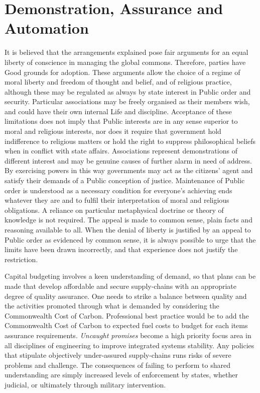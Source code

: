\documentclass[11pt, oneside]{book}   	%
\begin{document}
\section{Demonstration, Assurance and Automation}
It is believed that the arrangements explained pose fair arguments for an equal liberty of conscience in managing the global commons.
Therefore, parties have Good grounds for adoption.
These arguments allow the choice of a regime of moral liberty and freedom of thought and belief, and of religious practice, although these may be regulated as always by state interest in Public order and security.
Particular associations may be freely organised as their members wish, and could have their own internal Life and discipline.
Acceptance of these limitations does not imply that Public interests are in any sense superior to moral and religious interests, nor does it require that government hold indifference to religious matters or hold the right to suppress philosophical beliefs when in conflict with state affairs.
Associations represent demonstrations of different interest and may be genuine causes of further alarm in need of address.
By exercising powers in this way governments may act as the citizens' agent and satisfy their demands of a Public conception of justice.
Maintenance of Public order is understood as a necessary condition for everyone's achieving ends whatever they are and to fulfil their interpretation of moral and religious obligations.
A reliance on particular metaphysical doctrine or theory of knowledge is not required.
The appeal is made to common sense, plain facts and reasoning available to all.
When the denial of liberty is justified by an appeal to Public order as evidenced by common sense, it is always possible to urge that the limits have been drawn incorrectly, and that experience does not justify the restriction.\

Capital budgeting involves a keen understanding of demand, so that plans can be made that develop affordable and secure supply-chains with an appropriate degree of quality assurance.
One needs to strike a balance between quality and the activities promoted through what is demanded by considering the Commonwealth Cost of Carbon.
Professional best practice would be to add the Commonwealth Cost of Carbon to expected fuel costs to budget for each items assurance requirements.
\emph{Uncaught promises} become a high priority focus area in all disciplines of engineering to improve integrated systems stability.
Any policies that stipulate objectively under-assured supply-chains runs risks of severe problems and challenge.
The consequences of failing to perform to shared understanding are simply increased levels of enforcement by states, whether judicial, or ultimately through military intervention.\
\end{document}
